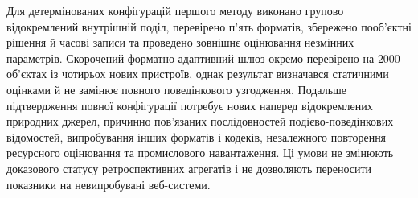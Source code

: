 Для детермінованих конфігурацій першого методу виконано групово відокремлений внутрішній поділ, перевірено п’ять форматів, збережено пооб’єктні рішення й часові записи та проведено зовнішнє оцінювання незмінних параметрів. Скорочений форматно-адаптивний шлюз окремо перевірено на $2000$ об’єктах із чотирьох нових пристроїв, однак результат визначався статичними оцінками й не замінює повного поведінкового узгодження. Подальше підтвердження повної конфігурації потребує нових наперед відокремлених природних джерел, причинно пов’язаних послідовностей подієво-поведінкових відомостей, випробування інших форматів і кодеків, незалежного повторення ресурсного оцінювання та промислового навантаження. Ці умови не змінюють доказового статусу ретроспективних агрегатів і не дозволяють переносити показники на невипробувані веб-системи.

\clearpage
